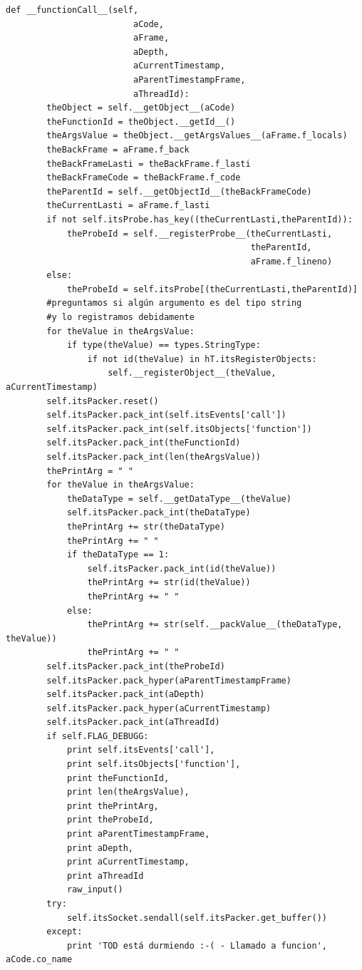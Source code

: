 \documentclass[12pt,legalpaper]{report}
\begin{document}
\begin{singlespace}
\begin{lstlisting}[style=Python]
    def __functionCall__(self, 
                         aCode, 
                         aFrame,
                         aDepth,
                         aCurrentTimestamp,
                         aParentTimestampFrame,
                         aThreadId):
        theObject = self.__getObject__(aCode)
        theFunctionId = theObject.__getId__()
        theArgsValue = theObject.__getArgsValues__(aFrame.f_locals)
        theBackFrame = aFrame.f_back
        theBackFrameLasti = theBackFrame.f_lasti
        theBackFrameCode = theBackFrame.f_code
        theParentId = self.__getObjectId__(theBackFrameCode)
        theCurrentLasti = aFrame.f_lasti
        if not self.itsProbe.has_key((theCurrentLasti,theParentId)):
            theProbeId = self.__registerProbe__(theCurrentLasti,
                                                theParentId,
                                                aFrame.f_lineno)
        else:
            theProbeId = self.itsProbe[(theCurrentLasti,theParentId)]
        #preguntamos si algún argumento es del tipo string
        #y lo registramos debidamente
        for theValue in theArgsValue:
            if type(theValue) == types.StringType:
                if not id(theValue) in hT.itsRegisterObjects:
                    self.__registerObject__(theValue, aCurrentTimestamp)             
        self.itsPacker.reset()
        self.itsPacker.pack_int(self.itsEvents['call'])
        self.itsPacker.pack_int(self.itsObjects['function'])
        self.itsPacker.pack_int(theFunctionId)
        self.itsPacker.pack_int(len(theArgsValue))
        thePrintArg = " "
        for theValue in theArgsValue:
            theDataType = self.__getDataType__(theValue)
            self.itsPacker.pack_int(theDataType)
            thePrintArg += str(theDataType)
            thePrintArg += " "
            if theDataType == 1:
                self.itsPacker.pack_int(id(theValue))
                thePrintArg += str(id(theValue))
                thePrintArg += " "
            else:
                thePrintArg += str(self.__packValue__(theDataType, theValue))
                thePrintArg += " "            
        self.itsPacker.pack_int(theProbeId)
        self.itsPacker.pack_hyper(aParentTimestampFrame)        
        self.itsPacker.pack_int(aDepth)
        self.itsPacker.pack_hyper(aCurrentTimestamp)
        self.itsPacker.pack_int(aThreadId)
        if self.FLAG_DEBUGG:
            print self.itsEvents['call'],
            print self.itsObjects['function'],
            print theFunctionId,
            print len(theArgsValue),
            print thePrintArg,
            print theProbeId,
            print aParentTimestampFrame,
            print aDepth,
            print aCurrentTimestamp,
            print aThreadId
            raw_input()
        try:
            self.itsSocket.sendall(self.itsPacker.get_buffer())
        except:
            print 'TOD está durmiendo :-( - Llamado a funcion', aCode.co_name        
            

\end{lstlisting}
\end{singlespace}
\end{document}
